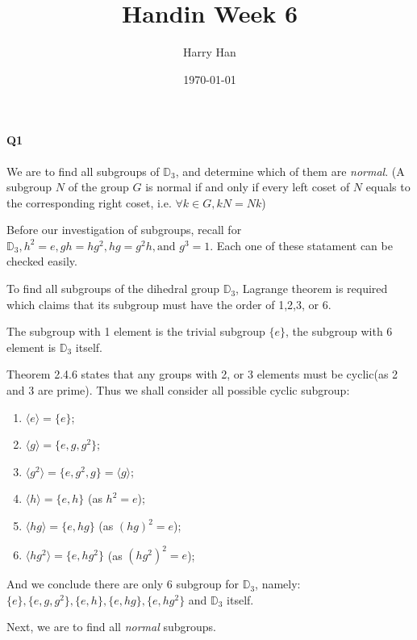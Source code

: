 \documentclass[12pt, a4paper]{article}
\title{Handin Week 6}
\author{Harry Han}
\date{\today}
\theoremstyle{definition}
\theoremstyle{remark}
\begin{document}
\maketitle
\paragraph{Q1}
We are to find all subgroups of $\mathbb{D}_3$, and determine which of them are \emph{normal}. (A subgroup $N$ of the group $G$ is normal if and only if every left coset of $N$ equals to the corresponding right coset, i.e. $\forall k \in G, kN = Nk$)

Before our investigation of subgroups, recall for $\mathbb{D}_3, h^2=e, gh = hg^2, hg = g^2h, \text{and } g^3 = 1$. Each one of these statament can be checked easily.

To find all subgroups of the dihedral group $\mathbb{D}_3$, Lagrange theorem is required which claims that its subgroup must have the order of 1,2,3, or 6. 

The subgroup with 1 element is the trivial subgroup $\{e\}$, the subgroup with 6 element is $\mathbb{D}_3$ itself. 

Theorem 2.4.6 states that any groups with 2, or 3 elements must be cyclic(as 2 and 3 are prime). Thus we shall consider all possible cyclic subgroup:

\begin{enumerate}
	\item $\langle e \rangle = \{e\}$;
	\item $\langle g \rangle = \{e, g, g^2\}$;
	\item $\langle g^2 \rangle = \{e, g^2, g\} = \langle g \rangle$;
	\item $\langle h \rangle = \{e, h\}$ (as $h^2=e$);
	\item $\langle hg \rangle = \{e, hg\}$ (as $(hg)^2=e$);
	\item $\langle hg^2 \rangle = \{e, hg^2\}$ (as $(hg^2)^2=e$);
\end{enumerate}
And we conclude there are only 6 subgroup for $\mathbb{D}_3$,
namely:\\ $\{e\}, \{e, g, g^2\}, \{e, h\}, \{e, hg\}, \{e, hg^2\}$ and $\mathbb{D}_3$ itself.

Next, we are to find all \emph{normal} subgroups.
\end{document}
